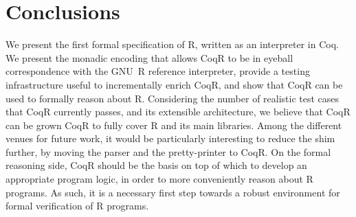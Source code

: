 \documentclass[
    sigplan,
    10pt,
    review, %
    natbib=false %
 ]{acmart}
\newcommand\CoqR{CoqR}
\newcommand\newtext[1]{{\color{blue} #1}}
\begin{document}
\section{Conclusions}
\label{sec:conclusion}

We present the first formal specification of R, written as an interpreter in Coq. We present the monadic encoding that allows \CoqR{} to be in eyeball correspondence with the GNU~R reference interpreter, provide a testing infrastructure useful to incrementally enrich \CoqR, and show that \CoqR{} can be used to formally reason about R. Considering the number of realistic test cases that \CoqR{} currently passes, and its extensible architecture, we believe that \CoqR{} can be grown \CoqR{} to fully cover R and its main libraries. 
\newtext{Among the different venues for future work, it would be particularly interesting to reduce the shim further, by moving the parser and the pretty-printer to \CoqR{}.} On the formal reasoning side, 
\CoqR{} should be the basis on top of which to develop an appropriate program logic, in order to more conveniently reason about R programs. As such, it is a necessary first step towards a robust environment for formal verification of R programs. 



\printbibliography{}
\end{document}
